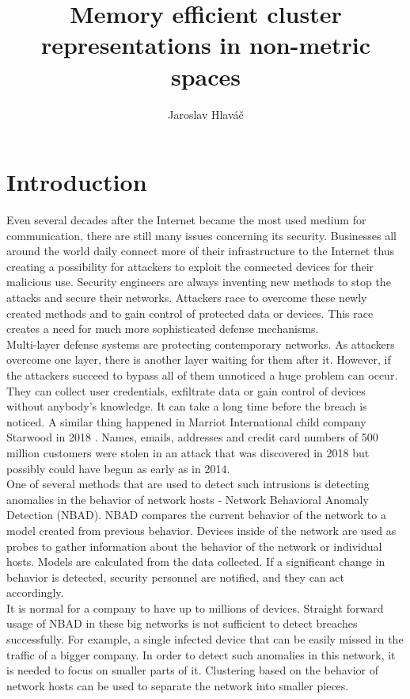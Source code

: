 \documentclass[thesis=B,english]{FITthesis}[2012/10/20]
\title{ Memory efficient cluster representations in non-metric spaces}
\author{Jaroslav Hlaváč} %
\begin{document}

\chapter{Introduction}

Even several decades after the Internet became the most used medium for communication, there are still many issues concerning its security.
Businesses all around the world daily connect more of their infrastructure to the Internet thus creating a possibility for attackers to exploit the connected devices for their malicious use.
Security engineers are always inventing new methods to stop the attacks and secure their networks.
Attackers race to overcome these newly created methods and to gain control of protected data or devices.
This race creates a need for much more sophisticated defense mechanisms. \\

Multi-layer defense systems are protecting contemporary networks.
As attackers overcome one layer, there is another layer waiting for them after it.
However, if the attackers succeed to bypass all of them unnoticed a huge problem can occur.
They can collect user credentials,  exfiltrate data or gain control of devices without anybody's knowledge.
It can take a long time before the breach is noticed.
A similar thing happened in Marriot International child company Starwood in 2018 \cite{hron2018breaches}.
Names, emails, addresses and credit card numbers of 500 million customers were stolen in an attack that was discovered in 2018 but possibly could have begun as early as in 2014. \\

One of several methods that are used to detect such intrusions is detecting anomalies in the behavior of network hosts - Network Behavioral Anomaly Detection (NBAD).
NBAD compares the current behavior of the network to a model created from previous behavior.
Devices inside of the network are used as probes to gather information about the behavior of the network or individual hosts.
Models are calculated from the data collected.
If a significant change in behavior is detected, security personnel are notified, and they can act accordingly. \\

It is normal for a company to have up to millions of devices.
Straight forward usage of NBAD in these big networks is not sufficient to detect breaches successfully.
For example, a single infected device that can be easily missed in the traffic of a bigger company.
In order to detect such anomalies in this network, it is needed to focus on smaller parts of it.
Clustering based on the behavior of network hosts can be used to separate the network into smaller pieces. \\
\end{document}
